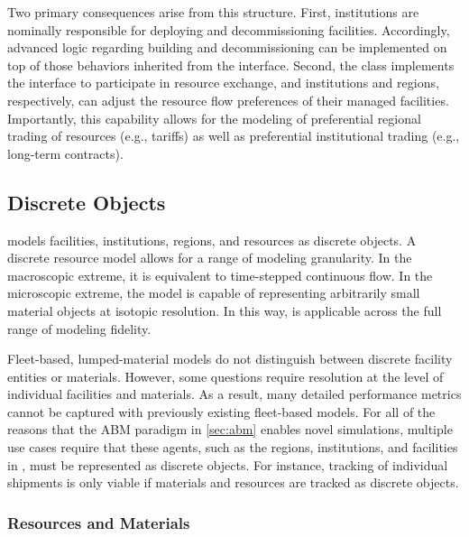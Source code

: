 Two primary consequences arise from this structure. First, institutions are
nominally responsible for deploying and decommissioning facilities. Accordingly, advanced
logic regarding building and decommissioning can be implemented on top of
those behaviors inherited from the
 interface. Second, the  class implements the
 interface to participate in resource exchange, and institutions and regions, respectively, can
adjust the resource flow preferences of their managed facilities. Importantly,
this capability allows for the modeling of preferential regional trading
of resources (e.g., tariffs) as well as preferential institutional trading
(e.g., long-term contracts).

\subsection{Discrete Objects}

\Cyclus models facilities, institutions, regions, and resources as discrete
objects. A discrete resource model allows for a range of modeling granularity. In the
macroscopic extreme, it is equivalent to time-stepped continuous flow. In the
microscopic extreme, the model is capable of representing arbitrarily small
material objects at isotopic resolution. In this way, \Cyclus is
applicable across the full range of modeling fidelity.

Fleet-based, lumped-material models do not distinguish between discrete facility
entities or materials. However, some questions require resolution at the level
of individual facilities and materials.  As a result, many detailed performance
metrics cannot be captured with previously existing fleet-based models. For all
of the reasons that the \gls{ABM} paradigm in \ref{sec:abm} enables novel
simulations, multiple use cases require that these agents, such as the regions,
institutions, and facilities in \Cyclus, must be represented as discrete
objects. For instance, tracking of individual shipments is only viable if materials and
resources are tracked as discrete objects.

\subsubsection{Resources and Materials}
\label{sec:mats}

